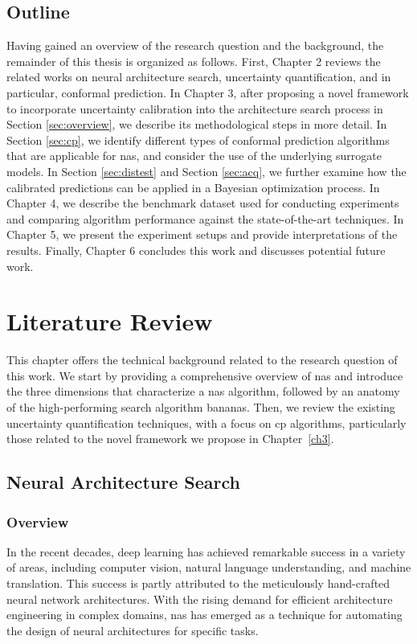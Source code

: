\documentclass[a4paper,oneside,bibliography=totoc]{scrbook}
\begin{document}
\section{Outline}
Having gained an overview of the research question and the background, the remainder of this thesis is organized as follows. First, Chapter 2 reviews the related works on neural architecture search, uncertainty quantification, and in particular, conformal prediction. In Chapter 3, after proposing a novel framework to incorporate uncertainty calibration into the architecture search process in Section \ref{sec:overview}, we describe its methodological steps in more detail. In Section \ref{sec:cp}, we identify different types of conformal prediction algorithms that are applicable for \gls{nas}, and consider the use of the underlying surrogate models. In Section \ref{sec:distest} and Section \ref{sec:acq}, we further examine how the calibrated predictions can be applied in a Bayesian optimization process. In Chapter 4, we describe the benchmark dataset used for conducting experiments and comparing algorithm performance against the state-of-the-art techniques. In Chapter 5, we present the experiment setups and provide interpretations of the results. Finally, Chapter 6 concludes this work and discusses potential future work.


\chapter{Literature Review}
This chapter offers the technical background related to the research question of this work. We start by providing a comprehensive overview of \gls{nas} and introduce the three dimensions that characterize a \gls{nas} algorithm, followed by an anatomy of the high-performing search algorithm \gls{bananas}. Then, we review the existing uncertainty quantification techniques, with a focus on \gls{cp} algorithms, particularly those related to the novel framework we propose in Chapter~\ref{ch3}.

\section{Neural Architecture Search}
\subsection{Overview}
In the recent decades, deep learning has achieved remarkable success in a variety of areas, including computer vision, natural language understanding, and machine translation. This success is partly attributed to the meticulously hand-crafted neural network architectures. With the rising demand for efficient architecture engineering in complex domains, \gls{nas} has emerged as a technique for automating the design of neural architectures for specific tasks.
 
\end{document}
